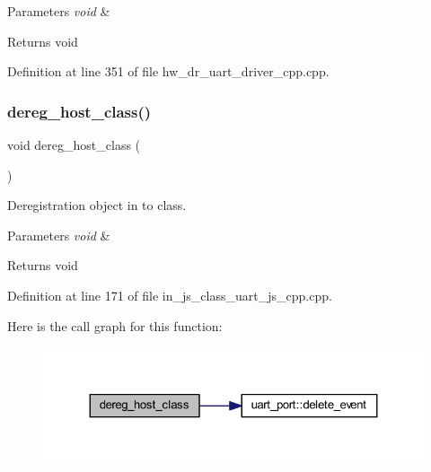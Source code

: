 \begin{DoxyParams}{Parameters}
{\em void} & \\
\hline
\end{DoxyParams}
\begin{DoxyReturn}{Returns}
void 
\end{DoxyReturn}


Definition at line 351 of file hw\+\_\+dr\+\_\+uart\+\_\+driver\+\_\+cpp.\+cpp.

\mbox{\label{group___u_a_r_t_ga8effd7f56034a13e7aa545821d729383}} 
\subsubsection{dereg\_host\_class()}
{\footnotesize\ttfamily void dereg\+\_\+host\+\_\+class (\begin{DoxyParamCaption}\item[{void}]{ }\end{DoxyParamCaption})}



Deregistration object in to class. 


\begin{DoxyParams}{Parameters}
{\em void} & \\
\hline
\end{DoxyParams}
\begin{DoxyReturn}{Returns}
void 
\end{DoxyReturn}


Definition at line 171 of file in\+\_\+js\+\_\+class\+\_\+uart\+\_\+js\+\_\+cpp.\+cpp.

Here is the call graph for this function\+:\nopagebreak
\begin{figure}[H]
\begin{center}
\leavevmode
\includegraphics[width=324pt]{group___u_a_r_t_ga8effd7f56034a13e7aa545821d729383_cgraph}
\end{center}
\end{figure}
\mbox{\label{group___u_a_r_t_gaa794a3286d40611ae62fc24176b751d1}} 
